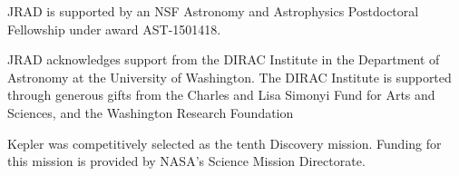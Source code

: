 \documentclass[preprint2]{aastex62}
\begin{document}
\acknowledgments
JRAD is supported by an NSF Astronomy and Astrophysics Postdoctoral Fellowship under award AST-1501418.

JRAD acknowledges support from the DIRAC Institute in the Department of Astronomy at the University of Washington. The DIRAC Institute is supported through generous gifts from the Charles and Lisa Simonyi Fund for Arts and Sciences, and the Washington Research Foundation


Kepler was competitively selected as the tenth Discovery mission. Funding for this mission is provided by NASA's Science Mission Directorate.




\end{document}
